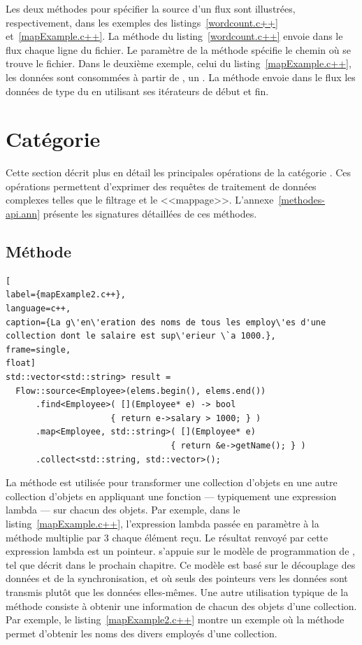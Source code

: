 Les deux m\'ethodes pour sp\'ecifier la source d'un flux sont illustr\'ees, respectivement, dans les exemples des listings~\ref{wordcount.c++} et~\ref{mapExample.c++}. La m\'ethode  du listing~\ref{wordcount.c++} envoie dans le flux chaque ligne du fichier. Le param\`etre  de la m\'ethode sp\'ecifie le chemin o\`u se trouve le fichier. Dans le deuxième exemple, celui du listing~\ref{mapExample.c++}, les donn\'ees sont consomm\'ees \`a partir de , un . La m\'ethode  envoie dans le flux les donn\'ees de type  du  en utilisant ses it\'erateurs de d\'ebut et fin.


\section{Cat\'egorie }

\label{transformation.sect}

Cette section d\'ecrit plus en d\'etail les principales op\'erations de la cat\'egorie . Ces op\'erations permettent d'exprimer des requ\^etes de traitement de donn\'ees complexes telles que le filtrage et le <<mappage>>. L'annexe~\ref{methodes-api.ann} présente les signatures détaillées de ces méthodes. 


\subsection{M\'ethode }



\begin{lstlisting}[
label={mapExample2.c++},
language=c++,
caption={La g\'en\'eration des noms de tous les employ\'es d'une collection dont le salaire est sup\'erieur \`a 1000.},
frame=single,
float]
std::vector<std::string> result =
  Flow::source<Employee>(elems.begin(), elems.end())
  	  .find<Employee>( [](Employee* e) -> bool 
					 { return e->salary > 1000; } )
      .map<Employee, std::string>( [](Employee* e) 
                                 { return &e->getName(); } )
      .collect<std::string, std::vector>();
\end{lstlisting}


La m\'ethode  est utilis\'ee pour transformer une collection d'objets en une autre collection d'objets en appliquant une fonction --- typiquement une expression lambda --- sur chacun des objets. Par exemple, dans le listing~\ref{mapExample.c++}, l'expression lambda pass\'ee en param\`etre \`a la m\'ethode  multiplie par 3 chaque \'el\'ement re\c{c}u. Le r\'esultat renvoy\'e par cette expression lambda est un pointeur. \PpFf{} s'appuie sur le mod\`ele de programmation de , tel que d\'ecrit dans le prochain chapitre. Ce mod\`ele est bas\'e sur le d\'ecouplage des donn\'ees et de la synchronisation, et o\`u seuls des pointeurs vers les donn\'ees sont transmis plut\^ot que les donn\'ees elles-m\^emes.
%
Une autre utilisation typique de la méthode  consiste \`a obtenir une information de chacun des objets d'une collection. Par exemple, le listing~\ref{mapExample2.c++} montre un exemple o\`u la méthode  permet d'obtenir les noms des divers employ\'es d'une collection. 



